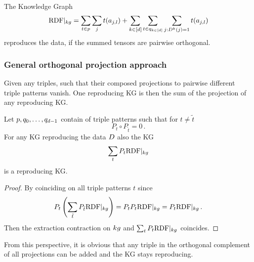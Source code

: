\begin{theorem}
	The Knowledge Graph
		\[ {\mathrm{RDF}}|_{kg} = \sum_{t \in p} \sum_{j} t(a_{j,l})
		+ \sum_{k\in[d]} \sum_{t \in q_{k\in[d]}} \sum_{j : D^{k}(j)=1} t(a_{j,l})\]
	reproduces the data, if the summed tensors are pairwise orthogonal.
\end{theorem}

\subsubsection{General orthogonal projection approach}

Given any triples, such that their composed projections to pairwise different triple patterns vanish. 
One reproducing KG is then the sum of the projection of any reproducing KG.



\begin{theorem}
	Let  $p,q_{0},\ldots,q_{d-1}$ contain of triple patterns such that for $t\neq \tilde{t}$
		\[ P_t \circ P_{\tilde{t}} = 0 \, . \]
	For any KG reproducing the data $D$ also the KG 
		\[ \sum_{t} P_t {\mathrm{RDF}}|_{kg} \]
	is a reproducing KG.
\end{theorem}
\begin{proof}
	By coinciding on all triple patterns $t$ since
		\[ P_t \left( \sum_{\tilde{t}} P_{\tilde{t}} {\mathrm{RDF}}|_{kg}  \right)  
		= P_t P_t {\mathrm{RDF}}|_{kg}  
		= P_t {\mathrm{RDF}}|_{kg}  \, .   \]
	Then the extraction contraction on $kg$ and $ \sum_{t} P_t{\mathrm{RDF}}|_{kg} $ coincides.
\end{proof}

From this perspective, it is obvious that any triple in the orthogonal complement of all projections can be added and the KG stays reproducing.


